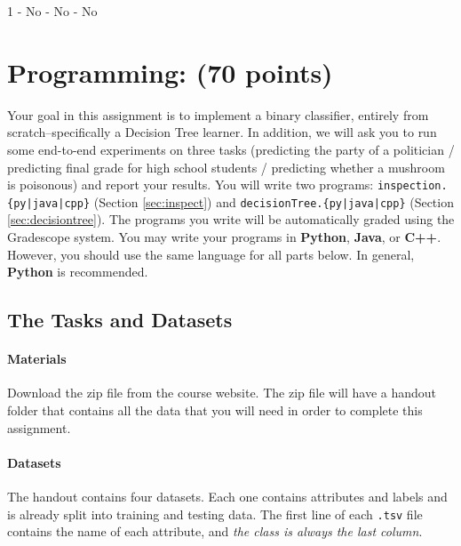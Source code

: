 \documentclass[11pt,addpoints,answers]{exam}
\begin{document}
\begin{your_solution}[height=6cm]
1 - No - No - No
\end{your_solution}\newpage

\section{Programming: (70 points)}

Your goal in this assignment is to implement a binary classifier, entirely from scratch--specifically a Decision Tree learner. In addition, we will ask you to run some end-to-end experiments on three tasks (predicting the party of a politician / predicting final grade for high school students / predicting whether a mushroom is poisonous) and report your results.
%
You will write two programs: \texttt{inspection.\{py|java|cpp\}} (Section \ref{sec:inspect}) and \texttt{decisionTree.\{py|java|cpp\}} (Section \ref{sec:decisiontree}). The programs you write will be automatically graded using the Gradescope system. You may write your programs in \textbf{Python}, \textbf{Java}, or \textbf{C++}. However, you should use the same language for all parts below. In general, \textbf{Python} is recommended.

\subsection{The Tasks and Datasets}
\label{sec:data}

\paragraph{Materials} Download the zip file from the course website. The zip file will have a handout folder that contains all the data that you will need in order to complete this assignment.

\paragraph{Datasets}

The handout contains four datasets. Each one contains attributes and labels and is already split into training and testing data. The first line of each \lstinline{.tsv} file contains the name of each attribute, and \emph{the class is always the last column}.
\end{document}
